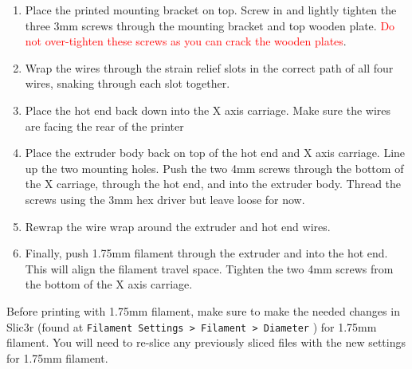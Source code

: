 \begin{enumerate}
\item Place the printed mounting bracket on top. Screw in and lightly tighten the three 3mm screws through the mounting bracket and top wooden plate. \textcolor{red}{Do not over-tighten these screws as you can crack the wooden plates}.
\item Wrap the wires through the strain relief slots in the correct path of all four wires, snaking through each slot together.
\item Place the hot end back down into the X axis carriage. Make sure the wires are facing the rear of the printer
\item Place the extruder body back on top of the hot end and X axis carriage. Line up the two mounting holes. Push the two 4mm screws through the bottom of the X carriage, through the hot end, and into the extruder body. Thread the screws using the 3mm hex driver but leave loose for now.
\item Rewrap the wire wrap around the extruder and hot end wires.
\item Finally, push 1.75mm filament through the extruder and into the hot end. This will align the filament travel space. Tighten the two 4mm screws from the bottom of the X axis carriage.
\end{enumerate}

Before printing with 1.75mm filament, make sure to make the needed changes in Slic3r (found at \texttt{Filament Settings > Filament > Diameter}  ) for 1.75mm filament. You will need to re-slice any previously sliced files with the new settings for 1.75mm filament.
